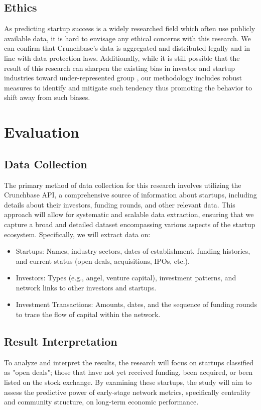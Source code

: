 \documentclass[a4paper,11pt]{article}
\begin{document}
\subsection{Ethics}
As predicting startup success is a widely researched field which often use publicly available data, it is hard to envisage any ethical concerns with this research. We can confirm that Crunchbase's data is aggregated and distributed legally and in line with data protection laws. Additionally, while it is still possible that the result of this research can sharpen the existing bias in investor and startup industries toward under-represented group \cite{ewens2020a} \cite{cumming2007a}, our methodology includes robust measures to identify and mitigate such tendency thus promoting the behavior to shift away from such biases.


\section{Evaluation}
\subsection{Data Collection}
The primary method of data collection for this research involves utilizing the Crunchbase API, a comprehensive source of information about startups, including details about their investors, funding rounds, and other relevant data. This approach will allow for systematic and scalable data extraction, ensuring that we capture a broad and detailed dataset encompassing various aspects of the startup ecosystem. Specifically, we will extract data on:
\begin{itemize}
    \item Startups: Names, industry sectors, dates of establishment, funding histories, and current status (open deals, acquisitions, IPOs, etc.).
    \item Investors: Types (e.g., angel, venture capital), investment patterns, and network links to other investors and startups.
    \item Investment Transactions: Amounts, dates, and the sequence of funding rounds to trace the flow of capital within the network.
\end{itemize}

\subsection{Result Interpretation}
To analyze and interpret the results, the research will focus on startups classified as "open deals"; those that have not yet received funding, been acquired, or been listed on the stock exchange. By examining these startups, the study will aim to assess the predictive power of early-stage network metrics, specifically centrality and community structure, on long-term economic performance.
\end{document}
